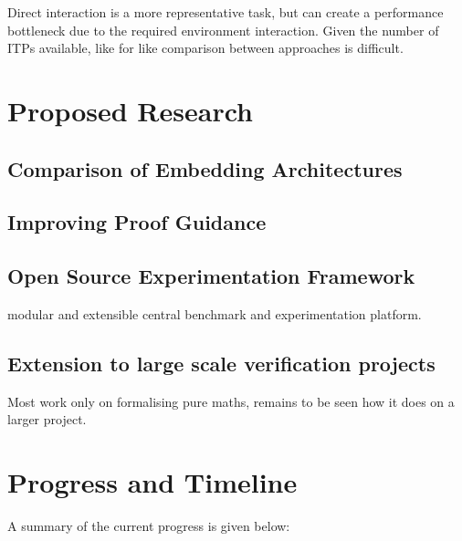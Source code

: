 \documentclass{article}
\begin{document}
    Direct interaction is a more representative task, but can create a performance bottleneck due to the required environment interaction.
    Given the number of ITPs available, like for like comparison between approaches is difficult.


    \section{Proposed Research}\label{sec:proposed-research}

    \subsection{Comparison of Embedding Architectures}\label{subsec:comparison-of-embedding-architectures}
    \subsection{Improving Proof Guidance}\label{subsec:proof-guidance}
    \subsection{Open Source Experimentation Framework}\label{subsec:open-source-experimentation-framework}
         modular and extensible central benchmark and experimentation platform.
    \subsection{Extension to large scale verification projects}\label{subsec:extension-to-large-scale-verification-projects}
        Most work only on formalising pure maths, remains to be seen how it does on a larger project.


    \section{Progress and Timeline}\label{sec:progress-and-timeline}
    A summary of the current progress is given below:
\end{document}
